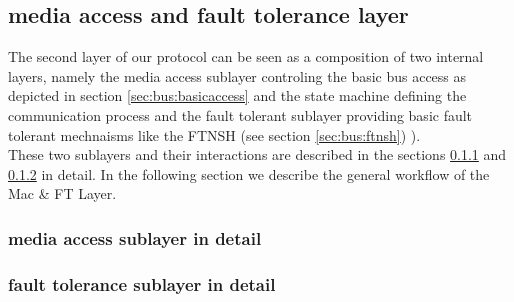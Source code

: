 \subsection{media access and fault tolerance layer}
\label{sec:bus:design:layer2}

The second layer of our protocol can be seen as a composition of two internal layers, 
namely the media access sublayer controling the basic bus access as depicted in section 
\ref{sec:bus:basicaccess}  and the state machine defining 
the communication process and the fault tolerant sublayer providing basic fault 
tolerant mechnaisms like the FTNSH (see section \ref{sec:bus:ftnsh}) ).\\

These two sublayers and their interactions are described in the sections 
\ref{sec:bus:design:layer2:mac}  and 
\ref{sec:bus:design:layer2:ft}  in detail. 
In the following section we describe the general workflow of the Mac \& FT Layer.\\

\subsubsection{media access sublayer in detail}
\label{sec:bus:design:layer2:mac}

\subsubsection{fault tolerance sublayer in detail}
\label{sec:bus:design:layer2:ft}


 